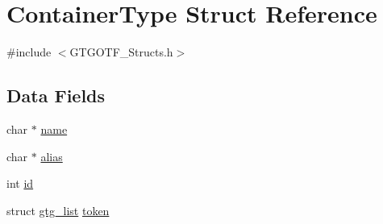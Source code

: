 \hypertarget{structContainerType}{\section{Container\-Type Struct Reference}
\label{structContainerType}
}


{\ttfamily \#include $<$G\-T\-G\-O\-T\-F\-\_\-\-Structs.\-h$>$}

\subsection*{Data Fields}
\begin{DoxyCompactItemize}
\item 
char $\ast$ \hyperlink{structContainerType_a8bf2b33a4144adf9d82b347b510e205c}{name}
\item 
char $\ast$ \hyperlink{structContainerType_a85ebdaf602c61a46cc07a505a16e6e33}{alias}
\item 
int \hyperlink{structContainerType_a02fb15eb66f37f3e1086f2ee0fb281fb}{id}
\item 
struct \hyperlink{structgtg__list}{gtg\-\_\-list} \hyperlink{structContainerType_a478bcc47be0ccd30b8e3627119cc3c82}{token}
\end{DoxyCompactItemize}


